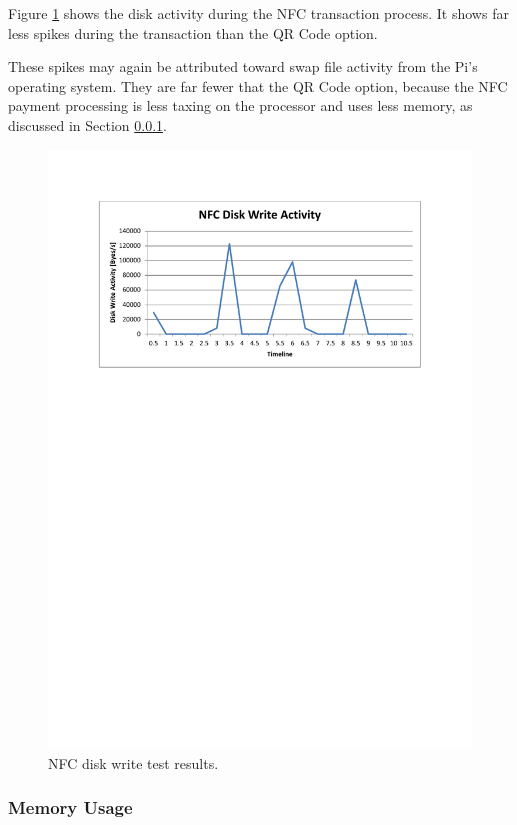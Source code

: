 Figure \ref{fig:nfc_test_disk} shows the disk activity during the NFC transaction process.
It shows far less spikes during the transaction than the QR Code option. 

These spikes may again be attributed toward swap file activity from the Pi's operating
system. They are far fewer that the QR Code option, because the NFC payment processing is
less taxing on the processor and uses less memory, as discussed in Section
\ref{sec:nfc_mem}.

\begin{figure}
 \centering 
 \includegraphics[clip=true, trim = 0 530 0 70,
 scale=0.7]{nfc_test_disk}
 \caption{NFC disk write test results.}
 \label{fig:nfc_test_disk}
\end{figure}

\subsubsection{Memory Usage}
\label{sec:nfc_mem}

